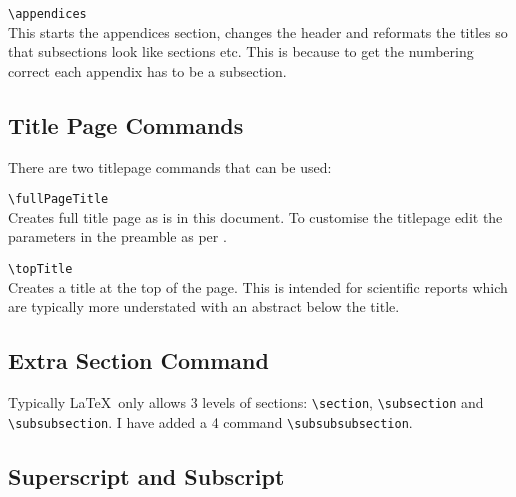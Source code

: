 \documentclass[a4paper, 12pt, english]{article}
\begin{document}
            \verb+\appendices+\\
            This starts the appendices section, changes the header and reformats the titles so that subsections look like sections etc. This is because to get the numbering correct each appendix has to be a subsection.


        \subsection{Title Page Commands}
            \label{subsec: title page commands}

            There are two titlepage commands that can be used:

            \verb+\fullPageTitle+\\
            Creates full title page as is in this document. To customise the titlepage edit the parameters in the preamble as per .

            \verb+\topTitle+\\
            Creates a title at the top of the page. This is intended for scientific reports which are typically more understated with an abstract below the title.


        \subsection{Extra Section Command}
            \label{subsec: extra section command}

            Typically \LaTeX~only allows 3 levels of sections: \verb+\section+, \verb+\subsection+ and \verb+\subsubsection+. I have added a 4 command \verb+\subsubsubsection+.


        \subsection{Superscript and Subscript}
            \label{subsec: superscript and subscript}
\end{document}
